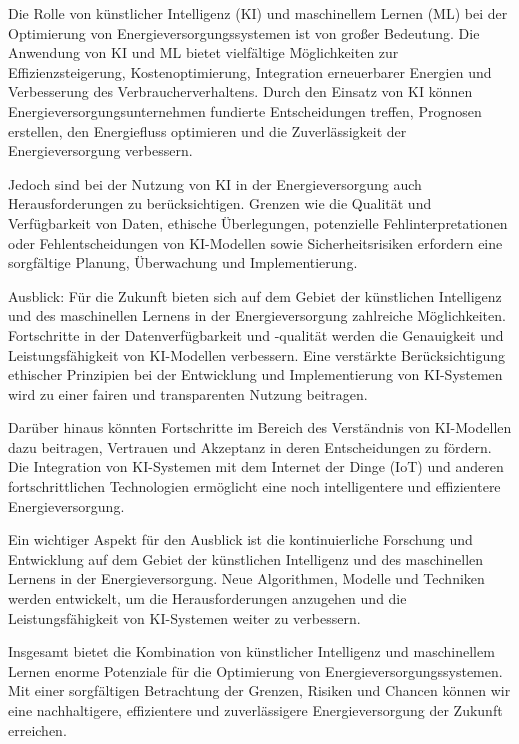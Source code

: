 Die Rolle von künstlicher Intelligenz (KI) und maschinellem Lernen (ML) bei der
Optimierung von Energieversorgungssystemen ist von großer Bedeutung. Die
Anwendung von KI und ML bietet vielfältige Möglichkeiten zur
Effizienzsteigerung, Kostenoptimierung, Integration erneuerbarer Energien und
Verbesserung des Verbraucherverhaltens. Durch den Einsatz von KI können
Energieversorgungsunternehmen fundierte Entscheidungen treffen, Prognosen
erstellen, den Energiefluss optimieren und die Zuverlässigkeit der
Energieversorgung verbessern.

Jedoch sind bei der Nutzung von KI in der Energieversorgung auch
Herausforderungen zu berücksichtigen. Grenzen wie die Qualität und
Verfügbarkeit von Daten, ethische Überlegungen, potenzielle
Fehlinterpretationen oder Fehlentscheidungen von KI-Modellen sowie
Sicherheitsrisiken erfordern eine sorgfältige Planung, Überwachung und
Implementierung.

Ausblick: Für die Zukunft bieten sich auf dem Gebiet der künstlichen
Intelligenz und des maschinellen Lernens in der Energieversorgung zahlreiche
Möglichkeiten. Fortschritte in der Datenverfügbarkeit und -qualität werden die
Genauigkeit und Leistungsfähigkeit von KI-Modellen verbessern. Eine verstärkte
Berücksichtigung ethischer Prinzipien bei der Entwicklung und Implementierung
von KI-Systemen wird zu einer fairen und transparenten Nutzung beitragen.

Darüber hinaus könnten Fortschritte im Bereich des Verständnis von
KI-Modellen dazu beitragen, Vertrauen und Akzeptanz in deren Entscheidungen zu
fördern. Die Integration von KI-Systemen mit dem Internet der Dinge (IoT) und
anderen fortschrittlichen Technologien ermöglicht eine noch intelligentere und
effizientere Energieversorgung.

Ein wichtiger Aspekt für den Ausblick ist die kontinuierliche Forschung und
Entwicklung auf dem Gebiet der künstlichen Intelligenz und des maschinellen
Lernens in der Energieversorgung. Neue Algorithmen, Modelle und Techniken
werden entwickelt, um die Herausforderungen anzugehen und die
Leistungsfähigkeit von KI-Systemen weiter zu verbessern.

Insgesamt bietet die Kombination von künstlicher Intelligenz und maschinellem
Lernen enorme Potenziale für die Optimierung von Energieversorgungssystemen.
Mit einer sorgfältigen Betrachtung der Grenzen, Risiken und Chancen können wir
eine nachhaltigere, effizientere und zuverlässigere Energieversorgung der
Zukunft erreichen.